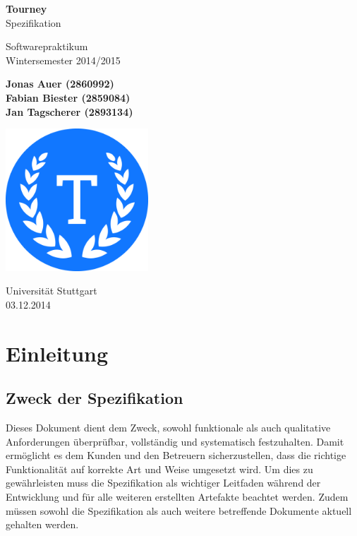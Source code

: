\documentclass[11pt]{article}
\begin{document}
\begin{titlepage}
	\begin{center}
		\vspace*{1cm}

		\Huge
		\textbf{Tourney}\\
		Spezifikation

		\vspace{0.5cm}
		\LARGE
		Softwarepraktikum\\
		\Large
		Wintersemester 2014/2015

		\vspace{1.5cm}

		\large
		\textbf{Jonas Auer (2860992)\\
				 Fabian Biester (2859084)\\
				 Jan Tagscherer (2893134)}

		\vfill

		\includegraphics[width=0.4\textwidth]{Logo.png}

		\vspace{1.5cm}

		\Large
		Universität Stuttgart\\
		03.12.2014
	\end{center}
\end{titlepage}

\newpage

\tableofcontents
\newpage

\section{Einleitung}

\subsection{Zweck der Spezifikation}

Dieses Dokument dient dem Zweck, sowohl funktionale als auch qualitative Anforderungen überprüfbar, vollständig und systematisch festzuhalten. Damit ermöglicht es dem Kunden und den Betreuern sicherzustellen, dass die richtige Funktionalität auf korrekte Art und Weise umgesetzt wird. Um dies zu gewährleisten muss die Spezifikation als wichtiger Leitfaden während der Entwicklung und für alle weiteren erstellten Artefakte beachtet werden. Zudem müssen sowohl die Spezifikation als auch weitere betreffende Dokumente aktuell gehalten werden.
\end{document}
